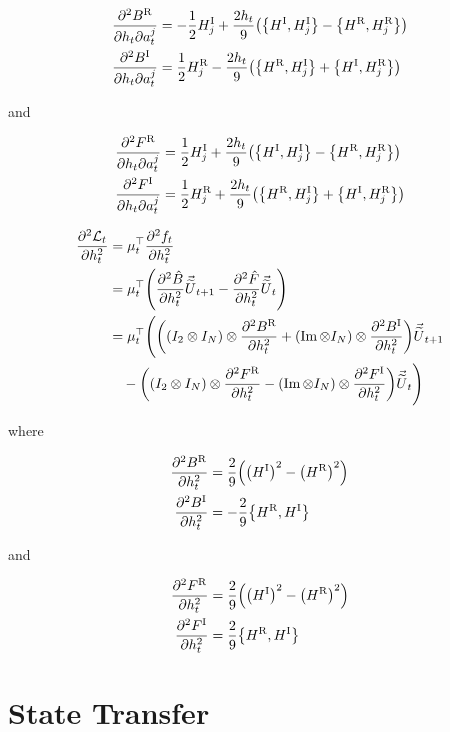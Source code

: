 \documentclass{article}
\newcommand{\isovecU}{\vec{\widetilde{U}}}
\newcommand{\HI}{H^{\text{I}}}
\newcommand{\HR}{H^{\text{R}}}
\newcommand{\BR}{B^{\text{R}}}
\newcommand{\BI}{B^{\text{I}}}
\newcommand{\FR}{F^{\text{R}}}
\newcommand{\FI}{F^{\text{I}}}
\begin{document}
\begin{align*}
  \pdv{\BR}{h_t}{a^j_t} &= -\frac{1}{2}\HI_j + \frac{2h_t}{9}\qty(\qty{\HI, \HI_j} - \qty{\HR, \HR_j})\\
  \pdv{\BI}{h_t}{a^j_t} &= \frac{1}{2}\HR_j - \frac{2h_t}{9}\qty(\qty{\HR, \HI_j} + \qty{\HI, \HR_j})\\
\end{align*}

and

\begin{align*}
  \pdv{\FR}{h_t}{a^j_t} &= \frac{1}{2}\HI_j + \frac{2h_t}{9}\qty(\qty{\HI, \HI_j} - \qty{\HR, \HR_j})\\
  \pdv{\FI}{h_t}{a^j_t} &= \frac{1}{2}\HR_j + \frac{2h_t}{9}\qty(\qty{\HR, \HI_j} + \qty{\HI, \HR_j})\\
\end{align*}

\begin{align*}
  \pdv[2]{\mathcal{L}_t}{h_t} &= \mu_t^\top \pdv[2]{f_t}{h_t} \\
  &= \mu_t^\top \qty(\pdv[2]{\hat B}{h_t} \isovecU_{t+1} - \pdv[2]{\hat F}{h_t} \isovecU_t) \\
  &= \mu_t^\top \Bigg( \qty(\qty(I_2 \otimes I_N) \otimes \pdv[2]{\BR}{h_t} + (\Im \otimes I_N) \otimes \pdv[2]{\BI}{h_t}) \isovecU_{t+1} \\
  & \quad - \qty(\qty(I_2 \otimes I_N) \otimes \pdv[2]{\FR}{h_t} - \qty(\Im \otimes I_N) \otimes \pdv[2]{\FI}{h_t}) \isovecU_t \Bigg) \\
\end{align*}

where

\begin{align*}
  \pdv[2]{\BR}{h_t} &= \frac{2}{9}\qty(\qty(\HI)^2 - \qty(\HR)^2)\\
  \pdv[2]{\BI}{h_t} &= -\frac{2}{9}\qty{\HR, \HI}\\
\end{align*}

and 

\begin{align*}
  \pdv[2]{\FR}{h_t} &= \frac{2}{9}\qty(\qty(\HI)^2 - \qty(\HR)^2)\\
  \pdv[2]{\FI}{h_t} &= \frac{2}{9}\qty{\HR, \HI}\\
\end{align*}


\section{State Transfer}
\end{document}
